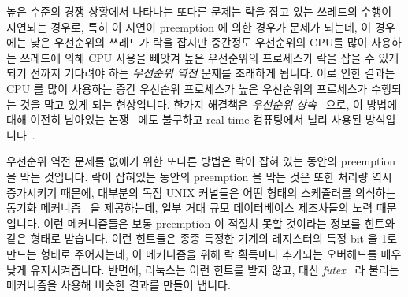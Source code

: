 높은 수준의 경쟁 상황에서 나타나는 또다른 문제는 락을 잡고 있는 쓰레드의 수행이
지연되는 경우로, 특히 이 지연이 preemption 에 의한 경우가 문제가 되는데, 이
경우에는 낮은 우선순위의 쓰레드가 락을 잡지만 중간정도 우선순위의 CPU를 많이
사용하는 쓰레드에 의해 CPU 사용을 빼앗겨 높은 우선순위의 프로세스가 락을 잡을
수 있게 되기 전까지 기다려야 하는 \emph{우선순위 역전} 문제를 초래하게 됩니다.
이로 인한 결과는 CPU 를 많이 사용하는 중간 우선순위 프로세스가 높은 우선순위의
프로세스가 수행되는 것을 막고 있게 되는 현상입니다.
한가지 해결책은 \emph{우선순위 상속}~\cite{Lampson1980Mesa} 으로, 이 방법에
대해 여전히 남아있는 논쟁~\cite{Yodaiken2004FSM,DougLocke2002a} 에도 불구하고
real-time 컴퓨팅에서 널리 사용된
방식입니다~\cite{Sha1990IEEETransComp,JonathanCorbet2006PriorityInheritance}.

우선순위 역전 문제를 없애기 위한 또다른 방법은 락이 잡혀 있는 동안의 preemption
을 막는 것입니다.
락이 잡혀있는 동안의 preemption 을 막는 것은 또한 처리량 역시 증가시키기
때문에, 대부분의 독점 UNIX 커널들은 어떤 형태의 스케쥴러를 의식하는 동기화
메커니즘~\cite{Kontothanassis97a} 을 제공하는데, 일부 거대 규모 데이터베이스
제조사들의 노력 때문입니다.
이런 메커니즘들은 보통 preemption 이 적절치 못할 것이라는 정보를 힌트와 같은
형태로 받습니다.
이런 힌트들은 종종 특정한 기계의 레지스터의 특정 bit 을 1로 만드는 형태로
주어지는데, 이 메커니즘을 위해 락 획득마다 추가되는 오버헤드를 매우 낮게
유지시켜줍니다.
반면에, 리눅스는 이런 힌트를 받지 않고, 대신
\emph{futex}~\cite{HubertusFrancke2002Futex,IngoMolnar2006RobustFutexes,StevenRostedt2006piFutexes,UlrichDrepper2011Futexes}
라 불리는 메커니즘을 사용해 비슷한 결과를 만들어 냅니다.

